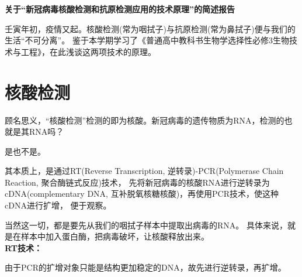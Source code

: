 \documentclass[UTF8,a4paper,11 pt]{ctexart}%
\begin{document}
	\setlength{\lineskip}{8pt}
	\setlength{\lineskiplimit}{8pt}
	\pagestyle{fancy}
	\fancyhead[C]{} %
	\fancyfoot[C]{\thepage}
	\begin{center}
		\LARGE{\textbf{关于“新冠病毒核酸检测和抗原检测应用的技术原理”的简述报告}}
	\end{center}
	\mbox{\qquad}壬寅年初，疫情又起。核酸检测(常为咽拭子)与抗原检测(常为鼻拭子)便与我们的生活“不可分离”。
	鉴于本学期学习了《普通高中教科书\quad 生物学\quad 选择性必修3\quad 生物技术与工程》，在此浅谈这两项技术的原理。
	\part{核酸检测}
	顾名思义，“核酸检测”检测的即为核酸。新冠病毒的遗传物质为RNA，检测的也就是其RNA吗？

	是也不是。
	
	其本质上，是通过RT(Reverse Transcription, 逆转录)-PCR(Polymerase Chain Reaction, 聚合酶链式反应)技术，
	先将新冠病毒的核酸RNA进行逆转录为cDNA(complementary DNA, 互补脱氧核糖核酸)，再使用PCR技术，使这种cDNA进行扩增，
	便于观察。

	当然这一切，都是要先从我们的咽拭子样本中提取出病毒的RNA。
	具体来说，就是在样本中加入蛋白酶，把病毒破坏，让核酸释放出来。
	\\\textbf{RT技术：}

	由于PCR的扩增对象只能是结构更加稳定的DNA，故先进行逆转录，再扩增。
\end{document}
